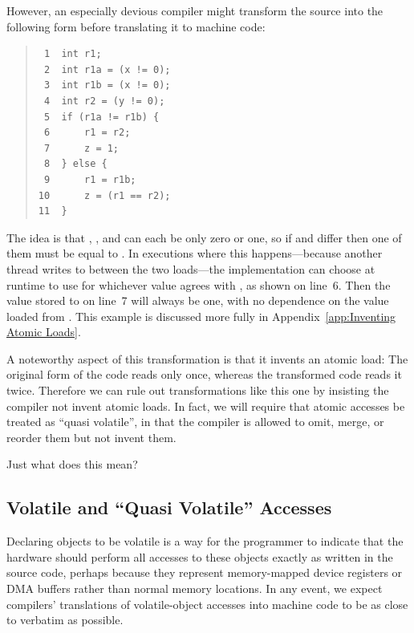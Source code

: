 \documentclass[10]{article}
\begin{document}
However, an especially devious compiler might transform the source into
the following form before translating it to machine code:
\begin{quote}
\begin{verbatim}
 1  int r1;
 2  int r1a = (x != 0);
 3  int r1b = (x != 0);
 4  int r2 = (y != 0);
 5  if (r1a != r1b) {
 6      r1 = r2;
 7      z = 1;
 8  } else {
 9      r1 = r1b;
10      z = (r1 == r2);
11  }
\end{verbatim}
\end{quote}
The idea is that , , and  can each be only zero or one,
so if  and  differ then one of them must be equal to .
In executions where this happens---because another thread writes to 
between the two loads---the implementation can choose at runtime to use
for  whichever value agrees with , as shown on line~6.
Then the value stored to  on line~7 will always be one,
with no dependence on the value loaded from .
This example is discussed more fully in
Appendix~\ref{app:Inventing Atomic Loads}.

A noteworthy aspect of this transformation is that it invents an atomic load:
The original form of the code reads  only once,
whereas the transformed code reads it twice.
Therefore we can rule out transformations like this one by insisting
the compiler not invent atomic loads.
In fact, we will require that atomic accesses be treated as
``quasi volatile'', in that the compiler is allowed to omit,
merge, or reorder them but not invent them.

Just what does this mean?

\subsection{Volatile and ``Quasi Volatile'' Accesses}
\label{sec:Volatile and Quasi Volatile Accesses}

Declaring objects to be volatile is a way for the programmer to
indicate that the hardware should perform all accesses to these
objects exactly as written in the source code, perhaps because they
represent memory-mapped device registers or DMA buffers rather than
normal memory locations.
In any event, we expect compilers' translations of volatile-object accesses
into machine code to be as close to verbatim as possible.
\end{document}
